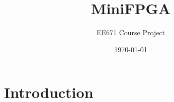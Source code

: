 \documentclass[11pt]{article}
\title{MiniFPGA}
\author{EE671 Course Project}
\date{\today}
\begin{document}
\maketitle

\section{Introduction}
\end{document}
